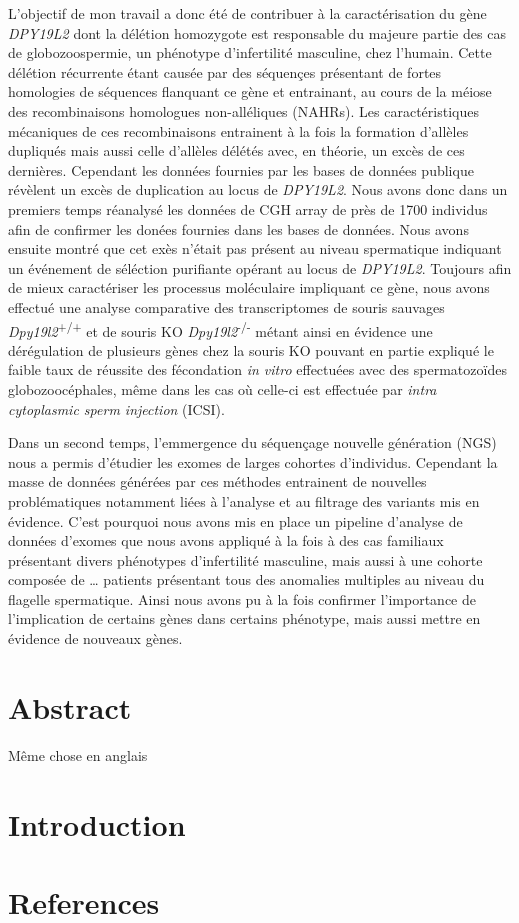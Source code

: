 \documentclass[12pt,twoside]{reedthesis}
\theoremstyle{definition}
\theoremstyle{definition}
\theoremstyle{remark}
\begin{document}
  L'objectif de mon travail a donc été de contribuer à la caractérisation
  du gène \emph{DPY19L2} dont la délétion homozygote est responsable du
  majeure partie des cas de globozoospermie, un phénotype d'infertilité
  masculine, chez l'humain. Cette délétion récurrente étant causée par des
  séquençes présentant de fortes homologies de séquences flanquant ce gène
  et entrainant, au cours de la méiose des recombinaisons homologues
  non-alléliques (NAHRs). Les caractéristiques mécaniques de ces
  recombinaisons entrainent à la fois la formation d'allèles dupliqués
  mais aussi celle d'allèles délétés avec, en théorie, un excès de ces
  dernières. Cependant les données fournies par les bases de données
  publique révèlent un excès de duplication au locus de \emph{DPY19L2}.
  Nous avons donc dans un premiers temps réanalysé les données de CGH
  array de près de 1700 individus afin de confirmer les donées fournies
  dans les bases de données. Nous avons ensuite montré que cet exès
  n'était pas présent au niveau spermatique indiquant un événement de
  séléction purifiante opérant au locus de \emph{DPY19L2}. Toujours afin
  de mieux caractériser les processus moléculaire impliquant ce gène, nous
  avons effectué une analyse comparative des transcriptomes de souris
  sauvages \emph{Dpy19l2}\textsuperscript{+/+} et de souris KO
  \emph{Dpy19l2}\textsuperscript{-/-} métant ainsi en évidence une
  dérégulation de plusieurs gènes chez la souris KO pouvant en partie
  expliqué le faible taux de réussite des fécondation \emph{in vitro}
  effectuées avec des spermatozoïdes globozoocéphales, même dans les cas
  où celle-ci est effectuée par \emph{intra cytoplasmic sperm injection}
  (ICSI).
  
  Dans un second temps, l'emmergence du séquençage nouvelle génération
  (NGS) nous a permis d'étudier les exomes de larges cohortes d'individus.
  Cependant la masse de données générées par ces méthodes entrainent de
  nouvelles problématiques notamment liées à l'analyse et au filtrage des
  variants mis en évidence. C'est pourquoi nous avons mis en place un
  pipeline d'analyse de données d'exomes que nous avons appliqué à la fois
  à des cas familiaux présentant divers phénotypes d'infertilité
  masculine, mais aussi à une cohorte composée de \ldots{} patients
  présentant tous des anomalies multiples au niveau du flagelle
  spermatique. Ainsi nous avons pu à la fois confirmer l'importance de
  l'implication de certains gènes dans certains phénotype, mais aussi
  mettre en évidence de nouveaux gènes.
  
  \newpage
  
  \chapter*{Abstract}\label{abstract}
  
  \newpage
  
  Même chose en anglais
  
  \chapter{Introduction}\label{introInf}
  
  \chapter*{References}\label{references}


\end{document}
